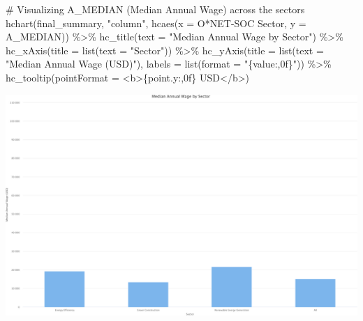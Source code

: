 \documentclass[
  letterpaper,
  DIV=11,
  numbers=noendperiod]{scrartcl}
\newenvironment{Shaded}{\begin{snugshade}}{\end{snugshade}}
\newcommand{\AttributeTok}[1]{\textcolor[rgb]{0.40,0.45,0.13}{#1}}
\newcommand{\CommentTok}[1]{\textcolor[rgb]{0.37,0.37,0.37}{#1}}
\newcommand{\FunctionTok}[1]{\textcolor[rgb]{0.28,0.35,0.67}{#1}}
\newcommand{\NormalTok}[1]{\textcolor[rgb]{0.00,0.23,0.31}{#1}}
\newcommand{\SpecialCharTok}[1]{\textcolor[rgb]{0.37,0.37,0.37}{#1}}
\newcommand{\StringTok}[1]{\textcolor[rgb]{0.13,0.47,0.30}{#1}}
\begin{document}
\begin{Shaded}
\begin{Highlighting}[]
\CommentTok{\# Visualizing A\_MEDIAN (Median Annual Wage) across the sectors}
\FunctionTok{hchart}\NormalTok{(final\_summary, }\StringTok{"column"}\NormalTok{, }\FunctionTok{hcaes}\NormalTok{(}\AttributeTok{x =} \StringTok{\textasciigrave{}}\AttributeTok{O*NET{-}SOC Sector}\StringTok{\textasciigrave{}}\NormalTok{, }\AttributeTok{y =}\NormalTok{ A\_MEDIAN)) }\SpecialCharTok{\%\textgreater{}\%}
  \FunctionTok{hc\_title}\NormalTok{(}\AttributeTok{text =} \StringTok{"Median Annual Wage by Sector"}\NormalTok{) }\SpecialCharTok{\%\textgreater{}\%}
  \FunctionTok{hc\_xAxis}\NormalTok{(}\AttributeTok{title =} \FunctionTok{list}\NormalTok{(}\AttributeTok{text =} \StringTok{"Sector"}\NormalTok{)) }\SpecialCharTok{\%\textgreater{}\%}
  \FunctionTok{hc\_yAxis}\NormalTok{(}\AttributeTok{title =} \FunctionTok{list}\NormalTok{(}\AttributeTok{text =} \StringTok{"Median Annual Wage (USD)"}\NormalTok{), }\AttributeTok{labels =} \FunctionTok{list}\NormalTok{(}\AttributeTok{format =} \StringTok{"\{value:,0f\}"}\NormalTok{)) }\SpecialCharTok{\%\textgreater{}\%}
  \FunctionTok{hc\_tooltip}\NormalTok{(}\AttributeTok{pointFormat =} \StringTok{\textquotesingle{}\textless{}b\textgreater{}\{point.y:,0f\} USD\textless{}/b\textgreater{}\textquotesingle{}}\NormalTok{)}
\end{Highlighting}
\end{Shaded}

\includegraphics{index_files/figure-pdf/unnamed-chunk-13-4.pdf}
\end{document}
